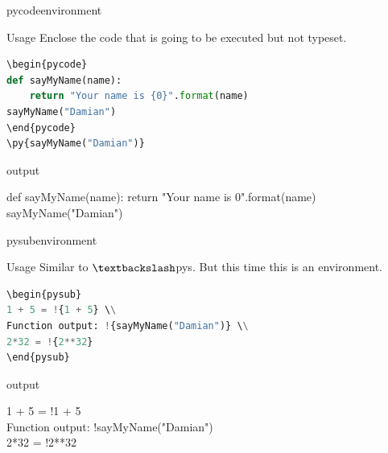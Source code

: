 \documentclass[
aspectratio=1610,
hyperref={pdfpagemode=FullScreen},
english,
usenames,
dvipsnames
]
{beamer} %
\begin{document}
  \begin{frame}[fragile]{pycode}{environment}
  
  \begin{block}{Usage}
  	Enclose the code that is going to be executed but not typeset.
  \end{block}
  
  \begin{lstlisting}[language=python]
\begin{pycode}
def sayMyName(name):
	return "Your name is {0}".format(name)
sayMyName("Damian")  
\end{pycode}
\py{sayMyName("Damian")}
  \end{lstlisting}
  
  	\begin{exampleblock}{output}
\begin{pycode}
def sayMyName(name):
	return "Your name is {0}".format(name)
sayMyName("Damian")  
\end{pycode}
    \onslide
	\end{exampleblock}
  
  \end{frame}
  
    \begin{frame}[fragile]{pysub}{environment}
  
  \begin{block}{Usage}
  	Similar to $\textbackslash$pys. But this time this is an environment.
  \end{block}
  
  \begin{lstlisting}[language=python]
\begin{pysub}
1 + 5 = !{1 + 5} \\
Function output: !{sayMyName("Damian")} \\
2*32 = !{2**32}
\end{pysub}
  \end{lstlisting}
  
  	\begin{exampleblock}{output}
\begin{pysub}
1 + 5 = !{1 + 5} \\
Function output: !{sayMyName("Damian")} \\
2*32 = !{2**32}
\end{pysub}
    \onslide
	\end{exampleblock}
  
  \end{frame}
  
\end{document}

